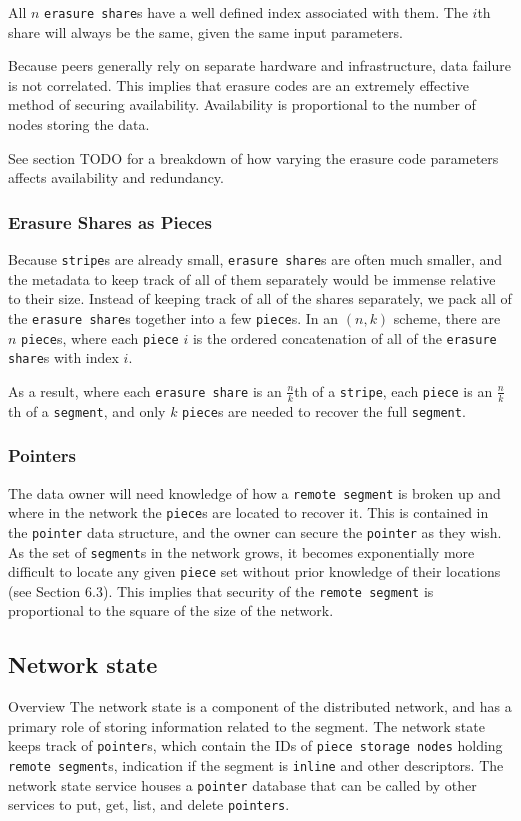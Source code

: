 \documentclass[a4paper,10pt]{article}
\newcommand{\x}[1]{{\tt #1}}
\newcommand{\todo}[1]{{\color{red} TODO #1}}
\begin{document}
All $n$ \x{erasure share}s have a well defined index associated with them. The
$i$th share will always be the same, given the same input parameters.

Because peers generally rely on separate hardware and infrastructure, data
failure is not correlated. This implies that erasure codes are an extremely
effective method of securing availability. Availability is proportional to the
number of nodes storing the data.

See section \todo{} for a breakdown of how varying the erasure code parameters
affects availability and redundancy.

\subsubsection{Erasure Shares as Pieces}

Because \x{stripe}s are already small, \x{erasure share}s are often
much smaller, and the metadata to keep track of all of them separately would be
immense relative to their size. Instead of keeping track of all of the shares
separately, we pack all of the \x{erasure share}s together into a few
\x{piece}s. In an $(n, k)$ scheme, there are $n$ \x{piece}s, where each
\x{piece} $i$ is the ordered concatenation of all of the \x{erasure share}s
with index $i$.

As a result, where each \x{erasure share} is an $\frac{n}{k}$th of a \x{stripe},
each \x{piece} is an $\frac{n}{k}$th of a \x{segment}, and only $k$ \x{piece}s
are needed to recover the full \x{segment}.

\subsubsection{Pointers}

The data owner will need knowledge of how a \x{remote segment} is broken up and
where in the network the \x{piece}s are located to recover it. This is contained
in the \x{pointer} data structure, and the owner can secure the \x{pointer} as
they wish. As the set of \x{segment}s in the network grows, it becomes
exponentially more difficult to locate any given \x{piece} set without prior
knowledge of their locations (see Section 6.3). This implies that security of
the \x{remote segment} is proportional to the square of the size of the network.

\subsection{Network state}
Overview
The network state is a component of the distributed network, and has a primary
role of storing information related to the segment. The network state keeps
track of \x{pointer}s, which contain the IDs of \x{piece storage nodes} holding \x{remote
segment}s, indication if the segment is \x{inline} and other descriptors. The network
state service houses a \x{pointer} database that can be called by other services
to put, get, list, and delete \x{pointers}.
\end{document}
